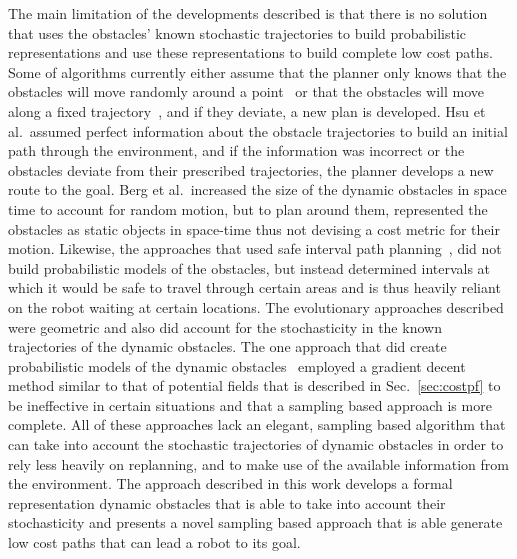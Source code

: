 The main limitation of the developments described is that there is no solution
that uses the obstacles' known stochastic trajectories to build probabilistic
representations and use these representations to build complete low cost paths.
Some of algorithms currently either assume that the planner only knows that the
obstacles will move randomly around a point~\cite{rodriguez2007framework} or
that the obstacles will move along a fixed trajectory~\cite{hsu2002randomized},
and if they deviate, a new plan is developed. Hsu et al.\ assumed perfect
information about the obstacle trajectories to build an initial path through
the environment, and if the information was incorrect or the obstacles deviate
from their prescribed trajectories, the planner develops a new route to the
goal. Berg et al.\ increased the size of the dynamic obstacles in space time to
account for random motion, but to plan around them, represented the obstacles
as static objects in space-time thus not devising a cost metric for their
motion. Likewise, the approaches that used safe interval path
planning~\cite{asipp, sipp}, did not build probabilistic models of the
obstacles, but instead determined intervals at which it would be safe to travel
through certain areas and is thus heavily reliant on the robot waiting at
certain locations. The evolutionary approaches described were geometric and
also did account for the stochasticity in the known trajectories of the dynamic
obstacles. The one approach that did create probabilistic models of the dynamic
obstacles~\cite{jensen2003motion} employed a gradient decent method similar to
that of potential fields that is described in Sec.~\ref{sec:costpf} to be
ineffective in certain situations and that a sampling based approach is more
complete. All of these approaches lack an elegant, sampling based algorithm
that can take into account the stochastic trajectories of dynamic obstacles in
order to rely less heavily on replanning, and to make use of the available
information from the environment. The approach described in this work develops
a formal representation dynamic obstacles that is able to take into account
their stochasticity and presents a novel sampling based approach that is able
generate low cost paths that can lead a robot to its goal.


